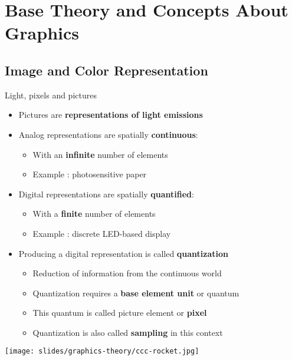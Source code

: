 \section{Base Theory and Concepts About Graphics}

\subsection{Image and Color Representation}

\begin{frame}{Light, pixels and pictures}
  \begin{minipage}{0.75\textwidth}
  \begin{itemize}
  \item Pictures are {\bf representations of light emissions}
  \item Analog representations are spatially {\bf continuous}:
    \begin{itemize}
    \item With an {\bf infinite} number of elements
    \item Example : photosensitive paper
    \end{itemize}
  \item Digital representations are spatially {\bf quantified}:
    \begin{itemize}
    \item With a {\bf finite} number of elements
    \item Example : discrete LED-based display
    \end{itemize}
  \item Producing a digital representation is called \textbf{quantization}
    \begin{itemize}
    \item Reduction of information from the continuous world
    \item Quantization requires a {\bf base element unit} or quantum
    \item This quantum is called picture element or {\bf pixel}
    \item Quantization is also called \textbf{sampling} in this context
    \end{itemize}
  \end{itemize}
  \end{minipage}%
  \begin{minipage}{0.25\textwidth}
  \texttt{[image: slides/graphics-theory/ccc-rocket.jpg]}
  \end{minipage}
\end{frame}

